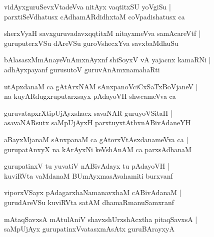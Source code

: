 \documentclass[twoside,12pt,openright]{book}
\newcounter{shloka}[chapter]
\begin{document}
\begin{shloka}
vidAyxguruSevxVtadeVva nitAyx vaqtitxSU yoVgiSu |\\
parxtiSeVdhatusx cAdhamARdidhxtaM coVpadishatusx ca 
\end{shloka}

\begin{shloka}
sherxVyaH savxguruvadavxqqtitxM nitayxmeVva samAcareVtf |\\
guruputerxVSu dAreVSu guroVshecxYva savxbaMdhuSu
\end{shloka}

\begin{shloka}
bAlasasxMmAnayeVnAmxnAyxnf shiSoyxV vA yajacnx kamaRNi |\\
adhAyxpayanf gurusutoV guruvAnAmxnamahaRti 
\end{shloka}

\begin{shloka}
utApxdanaM ca gAtArxNAM sAnxpanoVciCxSaTxBoVjaneV |\\
na kuyARdugxruputarxsayx pAdayoVH shwcameVva ca 
\end{shloka}

\begin{shloka}
guruvatapxrXtipUjAyxshacx savaNAR guruyoVSitaH |\\
asavaNARsutx saMpUjAyxH parxtuyxtAthxnABivAdaneYH 
\end{shloka}

\begin{shloka}
aBayxMjanaM sAnxpanaM ca gAtorxVtAsxdanameVva ca |\\
gurupatAnxyX na kArAyxNi keVshAnAM ca parxsAdhanaM 
\end{shloka}

\begin{shloka}
gurupatinxV tu yuvatiV nABivAdayx tu pAdayoVH |\\
kuviRVta vaMdanaM BUmAyxmasAvahamiti burxvanf
\end{shloka}

\begin{shloka}
viporxVSayx pAdagarxhaNamanavxhaM cABivAdanaM |\\
gurudAreVSu kuviRVta satAM dhamaRmanuSamxranf
\end{shloka}

\begin{shloka}
mAtaqSavxsA mAtulAniV shavxshUrxshAcxtha pitaqSavxsA |\\
saMpUjAyx gurupatinxVvatasxmAsAtx guruBArayxyA 
\end{shloka}
\end{document}
